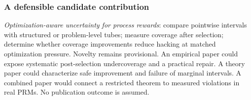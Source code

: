 \subsubsection{A defensible candidate contribution}
\emph{Optimization-aware uncertainty for process rewards}: compare pointwise
intervals with structured or problem-level tubes; measure coverage after
selection; determine whether coverage improvements reduce hacking at matched
optimization pressure. Novelty remains provisional. An empirical paper could
expose systematic post-selection undercoverage and a practical repair. A theory
paper could characterize safe improvement and failure of marginal intervals.
A combined paper would connect a restricted theorem to measured violations in
real PRMs. No publication outcome is assumed.

